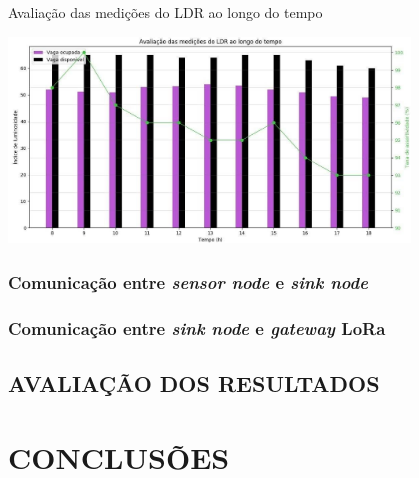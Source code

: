 \documentclass[oneside,openright,12pt]{ufsm_2015} %
\begin{document}
    \begin{grafico}[H]
     	    \caption{\label{exepretex} Avaliação das medições do LDR ao longo do tempo}
            \centering
            \includegraphics[width=0.8\textwidth]{figuras/ldr_graph.jpg}
            \vspace{\baselineskip} %
            \label{graph:ldr-aval}
    \end{grafico}
    
    \subsection{Comunicação entre \textit{sensor node} e \textit{sink node}}
    
    \subsection{Comunicação entre \textit{sink node} e \textit{gateway} LoRa}
    
\section{AVALIAÇÃO DOS RESULTADOS}




\chapter{CONCLUSÕES}
	 

        



\end{document}
